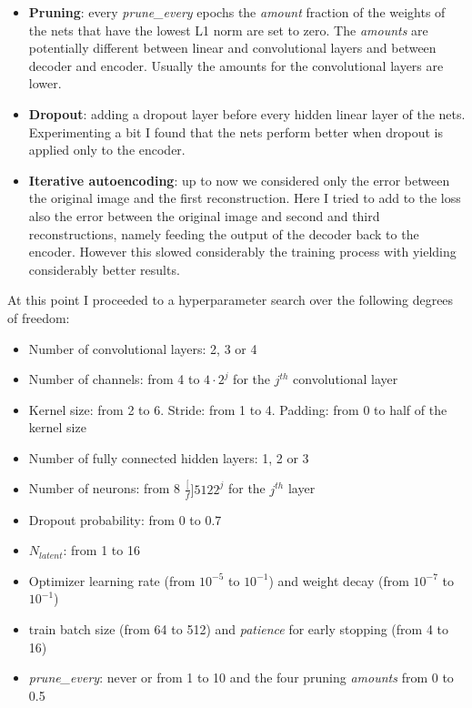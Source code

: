 \documentclass[a4paper, 11pt]{article}
\begin{document}
  \begin{itemize}
    \item \textbf{Pruning}: every \emph{prune\_every} epochs the \emph{amount} fraction of the weights of the nets that have the lowest L1 norm are set to zero. The \emph{amounts} are potentially different between linear and convolutional layers and between decoder and encoder. Usually the amounts for the convolutional layers are lower.
    \item \textbf{Dropout}: adding a dropout layer before every hidden linear layer of the nets. Experimenting a bit I found that the nets perform better when dropout is applied only to the encoder.
    \item \textbf{Iterative autoencoding}: up to now we considered only the error between the original image and the first reconstruction. Here I tried to add to the loss also the error between the original image and second and third reconstructions, namely feeding the output of the decoder back to the encoder. However this slowed considerably the training process with yielding considerably better results.
  \end{itemize}

  At this point I proceeded to a hyperparameter search over the following degrees of freedom:
  \begin{itemize}
    \item Number of convolutional layers: 2, 3 or 4
    \item Number of channels: from 4 to $4\cdot2^j$ for the $j^{th}$ convolutional layer
    \item Kernel size: from 2 to 6. Stride: from 1 to 4. Padding: from 0 to half of the kernel size
    \item Number of fully connected hidden layers: 1, 2 or 3
    \item Number of neurons: from 8 $\frac[f]{512}{2^j}$ for the $j^{th}$ layer
    \item Dropout probability: from 0 to 0.7
    \item $N_{latent}$: from 1 to 16
    \item Optimizer learning rate (from $10^{-5}$ to $10^{-1}$) and weight decay (from $10^{-7}$ to $10^{-1}$)
    \item train batch size (from 64 to 512) and \emph{patience} for early stopping (from 4 to 16)
    \item \emph{prune\_every}: never or from 1 to 10 and the four pruning \emph{amounts} from 0 to 0.5
  \end{itemize}
\end{document}
